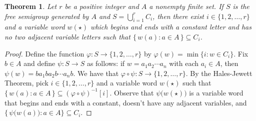 \documentclass[12pt,showtrims]{memoir}
\theoremstyle{plain}
\newtheorem{thm}{Theorem}[section]
\theoremstyle{definition}
\begin{document}
\begin{thm}
  \label{thm:special-hj}
  Let $r$ be a positive integer and $A$ a nonempty finite set.
  If $S$ is the free semigroup generated by $A$ and $S = \bigcup_{i=1}^r C_i$, then there exist $i \in \{1, 2, \ldots, r\}$ and a variable word $w(\star)$ which begins and ends with a constant letter and has no two adjacent variable letters such that $\bigl\{\, w(a) : a \in A \,\bigr\} \subseteq C_i$.
\end{thm}
\begin{proof}
  Define the function $\varphi \colon S \to \{1, 2, \ldots, r\}$ by $\varphi(w) = \min\{i : w \in C_i\}$. 
  Fix $b \in A$ and define $\psi \colon S \to S$ as follows: if $w = a_1a_2 \cdots a_n$ with each $a_i \in A$, then $\psi(w) = ba_1ba_2b\cdots a_nb$.
  We have that $\varphi \circ \psi \colon S \to \{1, 2, \ldots, r\}$.
  By the Hales-Jewett Theorem, pick $i \in \{1, 2, \ldots, r\}$ and a variable word $w(\star)$ such that $\{\, w(a) : a \in A \,\} \subseteq (\varphi \circ \psi)^{-1}[i]$.
  Observe that $\psi\bigl(w(\star)\bigr)$ is a variable word that begins and ends with a constant, doesn't have any adjacent variables, and $\{\, \psi\bigl(w(a)\bigr) : a \in A \} \subseteq C_i$.
\end{proof}
\end{document}
